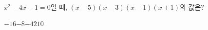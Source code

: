 $x^2-4x-1=0$일 때, $(x-5)(x-3)(x-1)(x+1)$의 값은?
\begin{choices32}{$-16$}{$-8$}{$-4$}{$2$}{$10$}\end{choices32}
